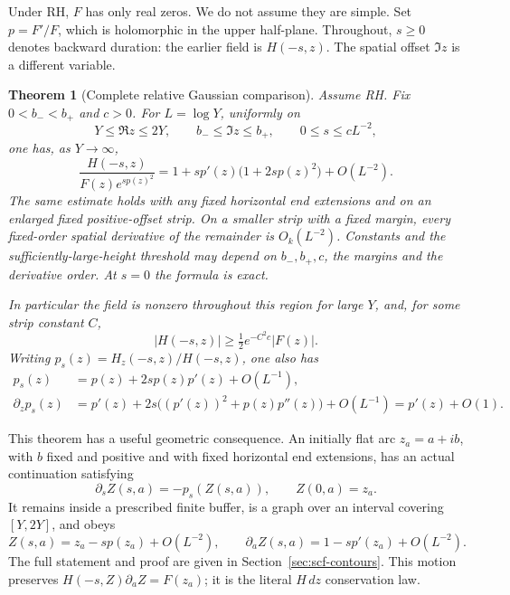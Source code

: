 \documentclass[11pt]{article}
\newtheorem{theorem}{Theorem}[section]
\theoremstyle{remark}
\begin{document}
Under RH, $F$ has only real zeros. We do not assume they are simple.
Set $p=F'/F$, which is holomorphic in the upper half-plane. Throughout,
$s\ge0$ denotes backward duration: the earlier field is $H(-s,z)$.
The spatial offset $\Im z$ is a different variable.

\begin{theorem}[Complete relative Gaussian comparison]
\label{thm:gaussian}
Assume RH. Fix $0<b_-<b_+$ and $c>0$. For $L=\log Y$, uniformly on
\[
 Y\le\Re z\le2Y,\qquad b_-\le\Im z\le b_+,\qquad
 0\le s\le cL^{-2},
\]
one has, as $Y\to\infty$,
\begin{equation}
 \boxed{\frac{H(-s,z)}{F(z)e^{sp(z)^2}}
 =1+s p'(z)\bigl(1+2s p(z)^2\bigr)+O(L^{-2}).}
 \label{eq:main-comparison}
\end{equation}
The same estimate holds with any fixed horizontal end extensions and
on an enlarged fixed positive-offset strip. On a smaller strip with a
fixed margin, every fixed-order spatial derivative of the remainder is
$O_k(L^{-2})$. Constants and the sufficiently-large-height threshold may
depend on $b_-,b_+,c$, the margins and the derivative order. At $s=0$
the formula is exact.

In particular the field is nonzero throughout this region for large
$Y$, and, for some strip constant $C$,
\begin{equation}
 |H(-s,z)|\ge\tfrac12e^{-C^2c}|F(z)|.
 \label{eq:acquired-floor}
\end{equation}
Writing $p_s(z)=H_z(-s,z)/H(-s,z)$, one also has
\begin{align}
 p_s(z)&=p(z)+2s p(z)p'(z)+O(L^{-1}),\label{eq:velocity-expansion}\\
 \partial_zp_s(z)&=p'(z)+2s\bigl((p'(z))^2+p(z)p''(z)\bigr)
                      +O(L^{-1})=p'(z)+O(1).
 \label{eq:strain-expansion}
\end{align}
\end{theorem}

This theorem has a useful geometric consequence. An initially flat
arc $z_a=a+ib$, with $b$ fixed and positive and with fixed horizontal
end extensions, has an actual continuation satisfying
\begin{equation}
 \partial_sZ(s,a)=-p_s(Z(s,a)),\qquad Z(0,a)=z_a.
 \label{eq:material-ode-intro}
\end{equation}
It remains inside a prescribed finite buffer, is a graph over an
interval covering $[Y,2Y]$, and obeys
\begin{equation}
 Z(s,a)=z_a-sp(z_a)+O(L^{-2}),\qquad
 \partial_a Z(s,a)=1-sp'(z_a)+O(L^{-2}).
 \label{eq:material-intro}
\end{equation}
The full statement and proof are given in Section~\ref{sec:scf-contours}.
This motion preserves $H(-s,Z)\partial_aZ=F(z_a)$; it is the literal
$H\,dz$ conservation law.
\end{document}
